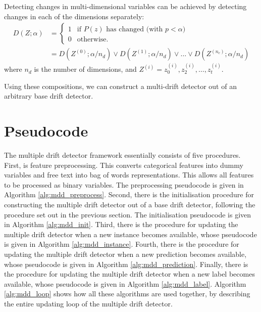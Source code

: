 Detecting changes in multi-dimensional variables can be achieved by detecting changes in each of the dimensions separately:
\begin{align}
  D(Z;\alpha) &= \begin{cases}
  1 & \text{if $P(z)$ has changed (with $p<\alpha$)} \\
  0 & \text{otherwise}.
  \end{cases} \\
  &= D(Z^{(0)};\alpha/n_d) \vee D(Z^{(1)};\alpha/n_d) \vee \dots \vee D(Z^{(n_c)};\alpha/n_d)
\end{align}
where $n_d$ is the number of dimensions, and $Z^{(i)}=z^{(i)}_0,z^{(i)}_2,\dots,z^{(i)}_t$.

Using these compositions, we can construct a multi-drift detector out of an arbitrary base drift detector.


\section{Pseudocode} \label{mdd:code}

The multiple drift detector framework essentially consists of five procedures. First, is feature preprocessing. This converts categorical features into dummy variables and free text into bag of words representations. This allows all features to be processed as binary variables. The preprocessing pseudocode is given in Algorithm \ref{alg:mdd_preprocess}. Second, there is the initialisation procedure for constructing the multiple drift detector out of a base drift detector, following the procedure set out in the previous section. The initialisation pseudocode is given in Algorithm \ref{alg:mdd_init}. Third, there is the procedure for updating the multiple drift detector when a new instance becomes available, whose pseudocode is given in Algorithm \ref{alg:mdd_instance}. Fourth, there is the procedure for updating the multiple drift detector when a new prediction becomes available, whose pseudocode is given in Algorithm \ref{alg:mdd_prediction}. Finally, there is the procedure for updating the multiple drift detector when a new label becomes available, whose pseudocode is given in Algorithm \ref{alg:mdd_label}. Algorithm \ref{alg:mdd_loop} shows how all these algorithms are used together, by describing the entire updating loop of the multiple drift detector.

